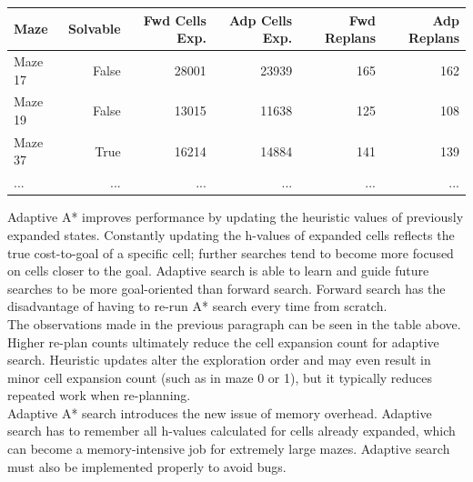 \documentclass{article}
\begin{document}
\begin{center}
\begin{tabular}{|l|r|r|r|r|r|}
\hline
\textbf{Maze} & \textbf{Solvable} & \textbf{Fwd Cells Exp.} & \textbf{Adp Cells Exp.} & \textbf{Fwd Replans} & \textbf{Adp Replans}\\
\hline
Maze 17  & False & 28001  & 23939 & 165 & 162 \\
Maze 19  & False & 13015 & 11638 & 125  & 108  \\
Maze 37  & True & 16214 & 14884 & 141  & 139  \\
...      & ...   & ...    & ...   & ... & ... \\
\hline
\end{tabular}
\end{center}

\noindent Adaptive A* improves performance by updating the heuristic values of previously expanded states. Constantly updating the h-values of expanded cells reflects the true cost-to-goal of a specific cell; further searches tend to become more focused on cells closer to the goal. Adaptive search is able to learn and guide future searches to be more goal-oriented than forward search. Forward search has the disadvantage of having to re-run A* search every time from scratch. \\

\noindent The observations made in the previous paragraph can be seen in the table above. Higher re-plan counts ultimately reduce the cell expansion count for adaptive search. Heuristic updates alter the exploration order and may even result in minor cell expansion count (such as in maze 0 or 1), but it typically reduces repeated work when re-planning.  \\

\noindent Adaptive A* search introduces the new issue of memory overhead. Adaptive search has to remember all h-values calculated for cells already expanded, which can become a memory-intensive job for extremely large mazes. Adaptive search must also be implemented properly to avoid bugs.
\end{document}
